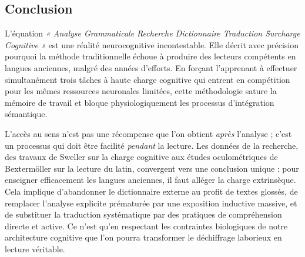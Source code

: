 \subsection{Conclusion}

L'équation \textit{« Analyse Grammaticale \+ Recherche Dictionnaire \+ Traduction \= Surcharge
Cognitive »} est une réalité neurocognitive incontestable. Elle décrit avec précision pourquoi la
méthode traditionnelle échoue à produire des lecteurs compétents en langues anciennes, malgré des
années d'efforts. En forçant l'apprenant à effectuer simultanément trois tâches à haute charge
cognitive qui entrent en compétition pour les mêmes ressources neuronales limitées, cette
méthodologie sature la mémoire de travail et bloque physiologiquement les processus d'intégration
sémantique.

L'accès au sens n'est pas une récompense que l'on obtient \textit{après} l'analyse ; c'est un
processus qui doit être facilité \textit{pendant} la lecture. Les données de la recherche, des
travaux de Sweller sur la charge cognitive aux études oculométriques de Bextermöller sur la lecture
du latin, convergent vers une conclusion unique : pour enseigner efficacement les langues anciennes,
il faut alléger la charge extrinsèque. Cela implique d'abandonner le dictionnaire externe au profit
de textes glossés, de remplacer l'analyse explicite prématurée par une exposition inductive massive,
et de substituer la traduction systématique par des pratiques de compréhension directe et active. Ce
n'est qu'en respectant les contraintes biologiques de notre architecture cognitive que l'on pourra
transformer le déchiffrage laborieux en lecture véritable.

